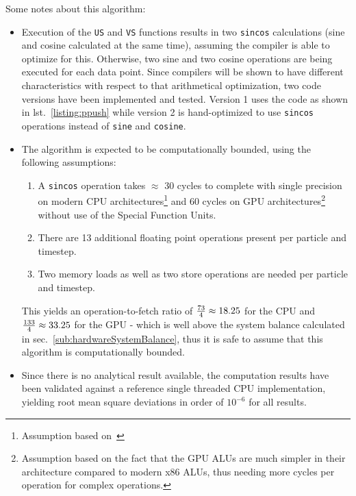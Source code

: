 Some notes about this algorithm: 
\begin{itemize}
 \item Execution of the \verb|US| and \verb|VS| functions results in two \verb|sincos| calculations (sine and cosine calculated at the same time), assuming the compiler is able to optimize for this. Otherwise, two sine and two cosine operations are being executed for each data point. Since compilers will be shown to have different characteristics with respect to that arithmetical optimization, two code versions have been implemented and tested. Version 1 uses the code as shown in lst.~\ref{listing:ppush} while version 2 is hand-optimized to use \verb|sincos| operations instead of \verb|sine| and \verb|cosine|.
 \item The algorithm is expected to be computationally bounded, using the following assumptions:
  \begin{enumerate}
    \item A \verb|sincos| operation takes $\approx$ 30 cycles to complete with single precision on modern CPU architectures\footnote{Assumption based on~\cite{SSETrigonmetric}} and 60 cycles on GPU architectures\footnote{Assumption based on the fact that the GPU ALUs are much simpler in their architecture compared to modern x86 ALUs, thus needing more cycles per operation for complex operations.} without use of the Special Function Units.
    \item There are 13 additional floating point operations present per particle and timestep.
    \item Two memory loads as well as two store operations are needed per particle and timestep. 
  \end{enumerate}
  This yields an operation-to-fetch ratio of ${73 \over 4} \approx 18.25$ for the CPU and ${133 \over 4} \approx 33.25$ for the GPU - which is well above the system balance calculated in sec.~\ref{sub:hardwareSystemBalance}, thus it is safe to assume that this algorithm is computationally bounded. 
 \item Since there is no analytical result available, the computation results have been validated against a reference single threaded CPU implementation, yielding root mean square deviations in order of $10^{-6}$ for all results.
\end{itemize}

